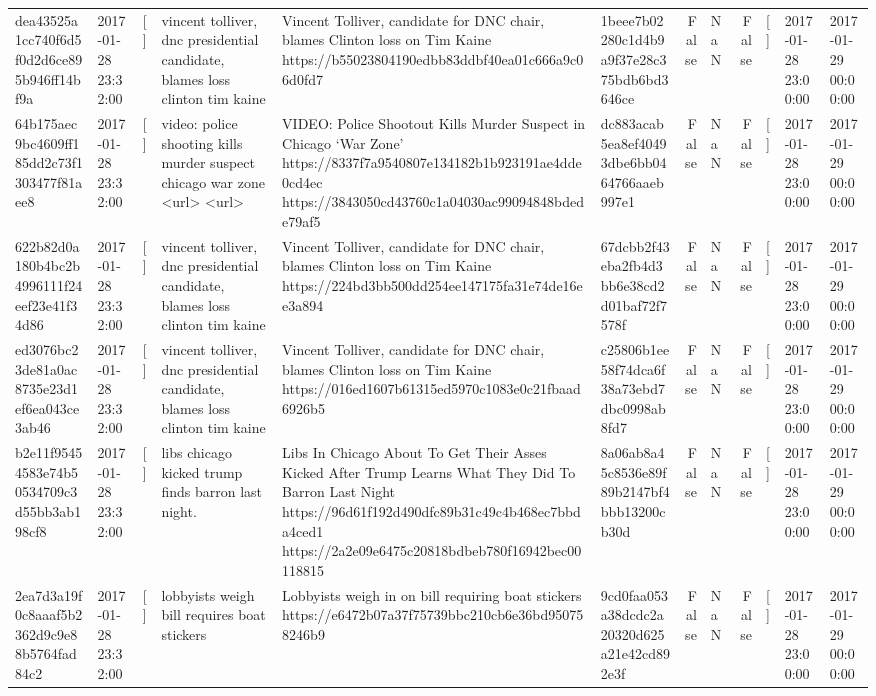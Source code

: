 \begin{tabular}{llllllrlrlll}
dea43525a1cc740f6d5f0d2d6ce895b946ff14bf9a & 2017-01-28 23:32:00 & [] & vincent tolliver, dnc presidential candidate, blames loss clinton tim kaine & Vincent Tolliver, candidate for DNC chair, blames Clinton loss on Tim Kaine https://b55023804190edbb83ddbf40ea01c666a9c06d0fd7 & 1beee7b02280c1d4b9a9f37e28c375bdb6bd3646ce & False & NaN & False & [] & 2017-01-28 23:00:00 & 2017-01-29 00:00:00 \\
64b175aec9bc4609ff185dd2c73f1303477f81aee8 & 2017-01-28 23:32:00 & [] & video: police shooting kills murder suspect chicago war zone <url> <url> & VIDEO: Police Shootout Kills Murder Suspect in Chicago ‘War Zone’ https://8337f7a9540807e134182b1b923191ae4dde0cd4ec https://3843050cd43760c1a04030ac99094848bdede79af5 & dc883acab5ea8ef40493dbe6bb0464766aaeb997e1 & False & NaN & False & [] & 2017-01-28 23:00:00 & 2017-01-29 00:00:00 \\
622b82d0a180b4bc2b4996111f24eef23e41f34d86 & 2017-01-28 23:32:00 & [] & vincent tolliver, dnc presidential candidate, blames loss clinton tim kaine & Vincent Tolliver, candidate for DNC chair, blames Clinton loss on Tim Kaine https://224bd3bb500dd254ee147175fa31e74de16ee3a894 & 67dcbb2f43eba2fb4d3bb6e38cd2d01baf72f7578f & False & NaN & False & [] & 2017-01-28 23:00:00 & 2017-01-29 00:00:00 \\
ed3076bc23de81a0ac8735e23d1ef6ea043ce3ab46 & 2017-01-28 23:32:00 & [] & vincent tolliver, dnc presidential candidate, blames loss clinton tim kaine & Vincent Tolliver, candidate for DNC chair, blames Clinton loss on Tim Kaine https://016ed1607b61315ed5970c1083e0c21fbaad6926b5 & c25806b1ee58f74dca6f38a73ebd7dbc0998ab8fd7 & False & NaN & False & [] & 2017-01-28 23:00:00 & 2017-01-29 00:00:00 \\
b2e11f95454583e74b50534709c3d55bb3ab198cf8 & 2017-01-28 23:32:00 & [] & libs chicago kicked trump finds barron last night. & Libs In Chicago About To Get Their Asses Kicked After Trump Learns What They Did To Barron Last Night https://96d61f192d490dfc89b31c49c4b468ec7bbda4ced1 https://2a2e09e6475c20818bdbeb780f16942bec00118815 & 8a06ab8a45c8536e89f89b2147bf4bbb13200cb30d & False & NaN & False & [] & 2017-01-28 23:00:00 & 2017-01-29 00:00:00 \\
2ea7d3a19f0c8aaaf5b2362d9c9e88b5764fad84c2 & 2017-01-28 23:32:00 & [] & lobbyists weigh bill requires boat stickers & Lobbyists weigh in on bill requiring boat stickers https://e6472b07a37f75739bbc210cb6e36bd950758246b9 & 9cd0faa053a38dcdc2a20320d625a21e42cd892e3f & False & NaN & False & [] & 2017-01-28 23:00:00 & 2017-01-29 00:00:00 \\

\end{tabular}
